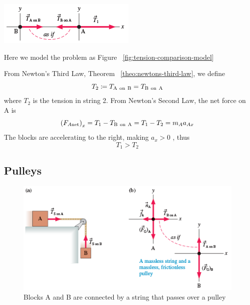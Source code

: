 \begin{Answer}
    \begin{minipage}[t]
        {0.4\linewidth}
        \vspace{-2ex} \includegraphics[width=\textwidth]{../figures/tension-comparison-model.png}
        \label{fig:tension-comparison-model}
    \end{minipage}
    Here we model the problem as Figure~%
    \ref{fig:tension-comparison-model}

    From Newton's Third Law, Theorem~%
    \ref{theo:newtons-third-law}, we define
    \begin{equation}
        T_2\coloneqq \magtarpair{A}{B} = \magtarpair{B}{A}
    \end{equation}
    where
    $
        T_2
    $ is the tension in string 2.  From Newton's Second Law, the net
    force on A is
    \begin{equation}
        \fnetx[A]=T_1-\magtarpair{B}{A}=T_1-T_2=m_Aa_{Ax}
    \end{equation}
    The blocks are accelerating to the right, making
    $
        a_x > 0
    $%
    , thus
    \begin{equation}
        T_1 > T_2
    \end{equation}
\end{Answer}

\subsection{Pulleys}

\begin{figure}
    \centering
    \includegraphics[width=\textwidth]{../figures/pulley-example-model.png}
    \caption{Blocks A and B are connected by a string that passes over a
    pulley}%
    \label{fig:pulley-example}
\end{figure}

